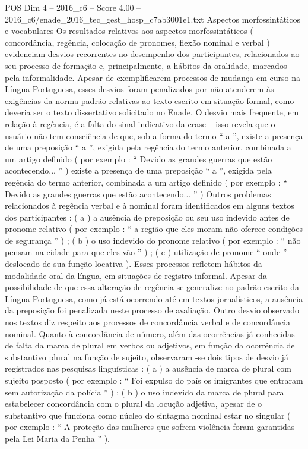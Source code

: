 \begin{textsample}{POS Dim 4 – 2016\_c6 – Score 4.00 – 2016\_c6/enade\_2016\_tec\_gest\_hosp\_c7ab3001e1.txt}
Aspectos morfossintáticos e vocabulares Os resultados relativos aos aspectos morfossintáticos ( concordância, regência, colocação de pronomes, flexão nominal e verbal ) evidenciam desvios recorrentes no desempenho dos participantes, relacionados ao seu processo de formação e, principalmente, a hábitos da oralidade, marcados pela informalidade.
Apesar de exemplificarem processos de mudança em curso na Língua Portuguesa, esses desvios foram penalizados por não atenderem às exigências da norma-padrão relativas ao texto escrito em situação formal, como deveria ser o texto dissertativo solicitado no Enade.
O desvio mais frequente, em relação à regência, é a falta do sinal indicativo da crase – isso revela que o usuário não tem consciência de que, sob a forma do termo “ a ”, existe a presença de uma preposição “ a ”, exigida pela regência do termo anterior, combinada a um artigo definido ( por exemplo : “ Devido as grandes guerras que estão acontecendo... ” ) existe a presença de uma preposição “ a ”, exigida pela regência do termo anterior, combinada a um artigo definido ( por exemplo : “ Devido as grandes guerras que estão acontecendo... ” ) Outros problemas relacionados à regência verbal e à nominal foram identificados em alguns textos dos participantes : ( a ) a ausência de preposição ou seu uso indevido antes de pronome relativo ( por exemplo : “ a região que eles moram não oferece condições de segurança ” ) ; ( b ) o uso indevido do pronome relativo ( por exemplo : “ não pensam na cidade para que eles vão ” ) ; ( c ) utilização de pronome “ onde ” deslocado de sua função locativa ).
Esses processos refletem hábitos da modalidade oral da língua, em situações de registro informal.
Apesar da possibilidade de que essa alteração de regência se generalize no padrão escrito da Língua Portuguesa, como já está ocorrendo até em textos jornalísticos, a ausência da preposição foi penalizada neste processo de avaliação.
Outro desvio observado nos textos diz respeito aos processos de concordância verbal e de concordância nominal.
Quanto à concordância de número, além das ocorrências já conhecidas de falta da marca de plural em verbos ou adjetivos, em função da ocorrência de substantivo plural na função de sujeito, observaram -se dois tipos de desvio já registrados nas pesquisas linguísticas : ( a ) a ausência de marca de plural com sujeito posposto ( por exemplo : “ Foi expulso do país os imigrantes que entraram sem autorização da polícia ” ) ; ( b ) o uso indevido da marca de plural para estabelecer concordância com o plural da locução adjetiva, apesar de o substantivo que funciona como núcleo do sintagma nominal estar no singular ( por exemplo : “ A proteção das mulheres que sofrem violência foram garantidas pela Lei Maria da Penha ” ).

\end{textsample}

